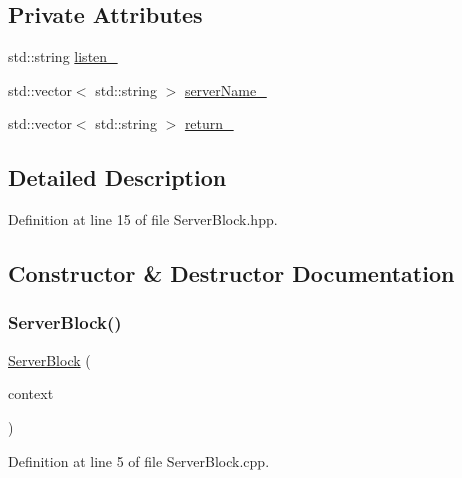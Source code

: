 \subsection*{Private Attributes}
\begin{DoxyCompactItemize}
\item 
std\+::string \hyperlink{classft_1_1_server_block_a5105357e893dd34d8e22d48def2fbafa}{listen\+\_\+}
\item 
std\+::vector$<$ std\+::string $>$ \hyperlink{classft_1_1_server_block_adc26ae834350b4c964d4198e7a431e90}{server\+Name\+\_\+}
\item 
std\+::vector$<$ std\+::string $>$ \hyperlink{classft_1_1_server_block_abab721f365aff66f8a1289de21c8f01f}{return\+\_\+}
\end{DoxyCompactItemize}


\subsection{Detailed Description}


Definition at line 15 of file Server\+Block.\+hpp.



\subsection{Constructor \& Destructor Documentation}
\mbox{\label{classft_1_1_server_block_ac14b720cf43fb61943107d397f5427f4}} 
\subsubsection{\texorpdfstring{Server\+Block()}{ServerBlock()}}
{\footnotesize\ttfamily \hyperlink{classft_1_1_server_block}{Server\+Block} (\begin{DoxyParamCaption}\item[{const \hyperlink{classft_1_1_base_directives}{Base\+Directives} \&}]{context }\end{DoxyParamCaption})}



Definition at line 5 of file Server\+Block.\+cpp.


